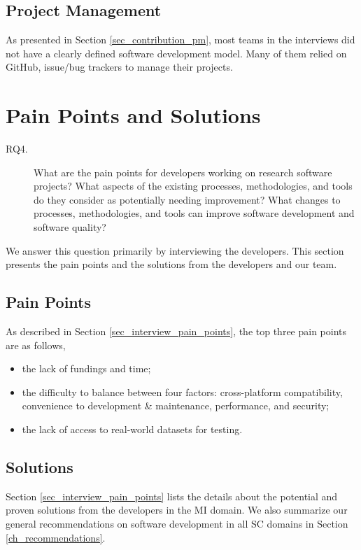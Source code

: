 \subsection{Project Management}
As presented in Section \ref{sec_contribution_pm}, most teams in the interviews did not have a clearly defined software development model. Many of them relied on GitHub, issue/bug trackers to manage their projects.

\section{Pain Points and Solutions}
\label{sec_rq_pain_points}
\begin{description}
\item[RQ4.] What are the pain points for developers working on research software projects? What aspects of the existing processes, methodologies, and tools do they consider as potentially needing improvement? What changes to processes, methodologies, and tools can improve software development and software quality?
\end{description}

We answer this question primarily by interviewing the developers. This section presents the pain points and the solutions from the developers and our team.

\subsection{Pain Points}
As described in Section \ref{sec_interview_pain_points}, the top three pain points are as follows,
\begin{itemize}
\item the lack of fundings and time;
\item the difficulty to balance between four factors: cross-platform compatibility, convenience to development \& maintenance, performance, and security;
\item the lack of access to real-world datasets for testing.
\end{itemize}

\subsection{Solutions}
Section \ref{sec_interview_pain_points} lists the details about the potential and proven solutions from the developers in the MI domain. We also summarize our general recommendations on software development in all SC domains in Section \ref{ch_recommendations}.

